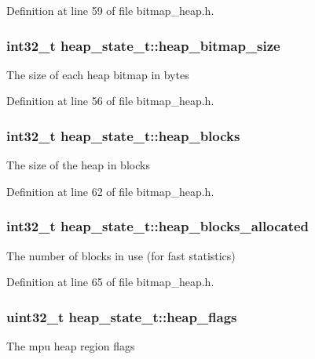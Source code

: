 Definition at line 59 of file bitmap\-\_\-heap.\-h.

\hypertarget{structheap__state__t_ae6493d6fa015bd8493807ea15e8216b8}{
\subsubsection[{heap\-\_\-bitmap\-\_\-size}]{\setlength{\rightskip}{0pt plus 5cm}int32\-\_\-t heap\-\_\-state\-\_\-t\-::heap\-\_\-bitmap\-\_\-size}}\label{structheap__state__t_ae6493d6fa015bd8493807ea15e8216b8}
The size of each heap bitmap in bytes 

Definition at line 56 of file bitmap\-\_\-heap.\-h.

\hypertarget{structheap__state__t_acf4ba85bf16cafbfe88c68c723f24b65}{
\subsubsection[{heap\-\_\-blocks}]{\setlength{\rightskip}{0pt plus 5cm}int32\-\_\-t heap\-\_\-state\-\_\-t\-::heap\-\_\-blocks}}\label{structheap__state__t_acf4ba85bf16cafbfe88c68c723f24b65}
The size of the heap in blocks 

Definition at line 62 of file bitmap\-\_\-heap.\-h.

\hypertarget{structheap__state__t_a6dfcea700f36435885d5b717cf2b3307}{
\subsubsection[{heap\-\_\-blocks\-\_\-allocated}]{\setlength{\rightskip}{0pt plus 5cm}int32\-\_\-t heap\-\_\-state\-\_\-t\-::heap\-\_\-blocks\-\_\-allocated}}\label{structheap__state__t_a6dfcea700f36435885d5b717cf2b3307}
The number of blocks in use (for fast statistics) 

Definition at line 65 of file bitmap\-\_\-heap.\-h.

\hypertarget{structheap__state__t_a58279b65bfa3fbe383c73cbdd7527af0}{
\subsubsection[{heap\-\_\-flags}]{\setlength{\rightskip}{0pt plus 5cm}uint32\-\_\-t heap\-\_\-state\-\_\-t\-::heap\-\_\-flags}}\label{structheap__state__t_a58279b65bfa3fbe383c73cbdd7527af0}
The mpu heap region flags 


